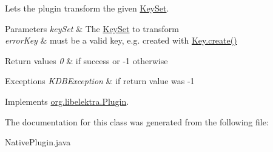Lets the plugin transform the given \hyperlink{classorg_1_1libelektra_1_1KeySet}{Key\+Set}. 


\begin{DoxyParams}{Parameters}
{\em key\+Set} & The \hyperlink{classorg_1_1libelektra_1_1KeySet}{Key\+Set} to transform \\
\hline
{\em error\+Key} & must be a valid key, e.\+g. created with \hyperlink{classorg_1_1libelektra_1_1Key_af407cf43625618af4e7fb2576037fcfc}{Key.\+create()} \\
\hline
\end{DoxyParams}

\begin{DoxyRetVals}{Return values}
{\em 0} & if success or -\/1 otherwise \\
\hline
\end{DoxyRetVals}

\begin{DoxyExceptions}{Exceptions}
{\em K\+D\+B\+Exception} & if return value was -\/1 \\
\hline
\end{DoxyExceptions}


Implements \hyperlink{interfaceorg_1_1libelektra_1_1Plugin_a650ce789086f5becf21c5f91fad4c42e}{org.\+libelektra.\+Plugin}.



The documentation for this class was generated from the following file\+:\begin{DoxyCompactItemize}
\item 
Native\+Plugin.\+java\end{DoxyCompactItemize}
